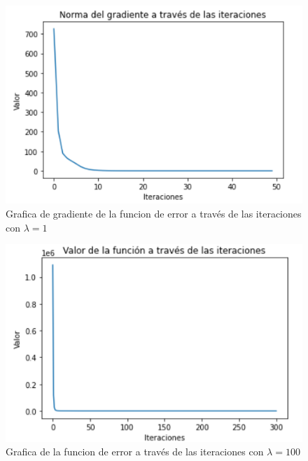 \documentclass[conference]{IEEEtran}
\begin{document}
\begin{figure}[htbp]
    \centerline{\includegraphics[scale=0.25]{r1g.png}}
    \caption{Grafica de gradiente de la funcion de error a través de las iteraciones con $\lambda=1$}
    \label{r1g}
\end{figure}

\begin{figure}[htbp]
    \centerline{\includegraphics[scale=0.25]{r100f.png}}
    \caption{Grafica de la funcion de error a través de las iteraciones con $\lambda=100$}
    \label{r100f}
\end{figure}
\end{document}
